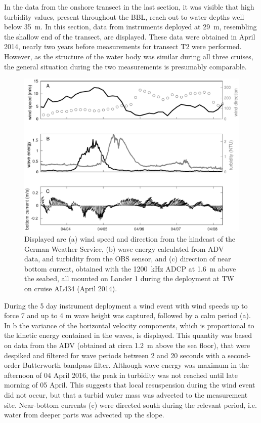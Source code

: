 In the data from the onshore transect in the last section, it was visible that 
high turbidity values, present throughout the BBL, reach out to water depths 
well below 35~m. In this section, data from instruments deployed at 29~m, 
resembling the shallow end of the transect, are displayed. These data were 
obtained in April 2014, nearly two years before measurements for transect T2 
were performed. However, as the structure of the water body was similar during 
all three cruises, the general situation during the two measurements is 
presumably comparable.

 \begin{figure}[ht]
\includegraphics[width=15cm]{bilder/al434tw.pdf}
 \caption{Displayed are (a) wind speed and direction from the hindcast of the 
German Weather Service, (b) wave energy calculated from ADV data, and turbidity 
from the OBS sensor, and (c) direction of near bottom current, obtained with 
the 1200~kHz ADCP at 1.6~m above the seabed, all mounted on Lander 1 during the 
deployment at TW on cruise AL434 (April 2014).}
 \label{tromperwiek}
 \end{figure}
 
During the 5 day instrument deployment a wind event with wind 
speeds up to force 7 and up to 4 m wave height was captured, followed by a calm 
period (a). In b the variance of the 
horizontal velocity components, which is proportional to the kinetic energy 
contained in the waves, is displayed. This quantity was based on data from the 
ADV (obtained 
at circa 1.2~m above the sea floor), that were despiked \citep[][]{goring2002} 
and 
filtered for wave periods between 2 and 20 seconds with a second-order 
Butterworth bandpass filter. Although wave energy was maximum in the afternoon 
of 04 April 2016, the peak in turbidity was not reached until late morning of 
05 April. This suggests that local resuspension during the wind event did not 
occur, but that a turbid water mass was advected to the measurement site. 
Near-bottom currents (c) were directed south during the 
relevant period, i.e. water from deeper parts was advected up the slope.
 
